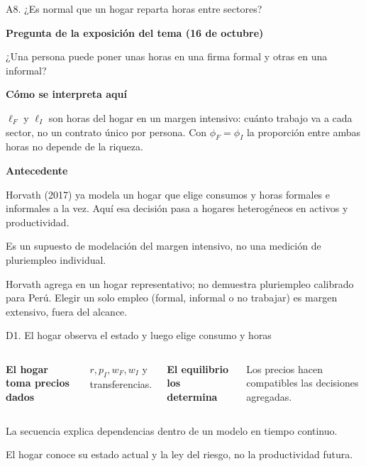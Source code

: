 \documentclass[aspectratio=169,11pt]{beamer}
\newcommand{\source}[1]{\par\vfill{\fontsize{8}{9.5}\selectfont\color{Gray}#1\par}}
\newcommand{\takeaway}[1]{\par\vspace{2mm}\begingroup\setlength{\fboxsep}{2.2mm}\colorbox{Pale}{\begin{minipage}{\dimexpr\linewidth-4.4mm\relax}\small\raggedright #1\end{minipage}}\endgroup\par}
\newcommand{\labeltext}[1]{\par{\small\bfseries\color{Teal}#1\par}\vspace{1.5mm}}
\newcommand{\back}[1]{\hfill\hyperlink{#1}{\beamerreturnbutton{Volver}}}
\begin{document}
\begin{frame}[label=reparto]{A8. ¿Es normal que un hogar reparta horas entre sectores?}
\labeltext{Pregunta de la exposición del tema (16 de octubre)}
¿Una persona puede poner unas horas en una firma formal y otras en una informal?
\vspace{3mm}\labeltext{Cómo se interpreta aquí}
\small $\ell_F$ y $\ell_I$ son horas del hogar en un margen intensivo: cuánto trabajo va a cada sector, no un contrato único por persona. Con $\phi_F=\phi_I$ la proporción entre ambas horas no depende de la riqueza.
\vspace{3mm}\labeltext{Antecedente}
Horvath (2017) ya modela un hogar que elige consumos y horas formales e informales a la vez. Aquí esa decisión pasa a hogares heterogéneos en activos y productividad.
\takeaway{Es un supuesto de modelación del margen intensivo, no una medición de pluriempleo individual.}
\source{Horvath agrega en un hogar representativo; no demuestra pluriempleo calibrado para Perú. Elegir un solo empleo (formal, informal o no trabajar) es margen extensivo, fuera del alcance.}\back{modelo}
\end{frame}
\begin{frame}[label=det1]{D1. El hogar observa el estado y luego elige consumo y horas}
\centering
{}
\vspace{5mm}
\begin{columns}[T,onlytextwidth]
\labeltext{El hogar toma precios dados}$r,p_I,w_F,w_I$ y transferencias.
\labeltext{El equilibrio los determina}Los precios hacen compatibles las decisiones agregadas.
\end{columns}
\takeaway{La secuencia explica dependencias dentro de un modelo en tiempo continuo.}
\source{El hogar conoce su estado actual y la ley del riesgo, no la productividad futura.}
\back{anexos}
\end{frame}
\end{document}
